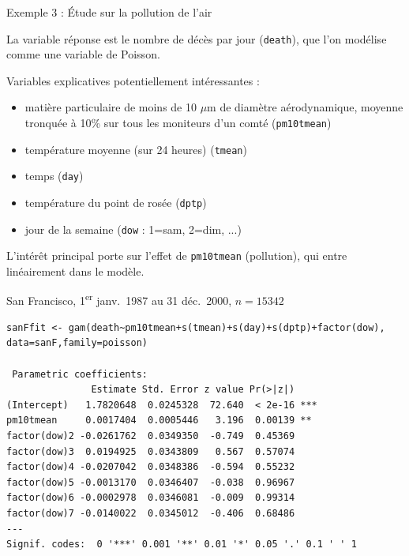 \documentclass{BeamerTemplate}
\begin{document}
\begin{refsection}
\begin{frame}{Exemple 3 : Étude sur la pollution de l'air}
\bigskip

La variable réponse est le nombre de décès par jour (\texttt{death}), que l'on
modélise comme une variable de Poisson.
\end{frame}

\begin{frame}{}

Variables explicatives potentiellement intéressantes :
\begin{itemize}
\item matière particulaire de moins de 10 $\mu$m de diamètre aérodynamique,
moyenne tronquée à 10\% sur tous les moniteurs d'un comté (\texttt{pm10tmean})
\item température moyenne (sur 24 heures) (\texttt{tmean})
\item temps (\texttt{day})
\item température du point de rosée (\texttt{dptp})
\item jour de la semaine (\texttt{dow} : 1=sam, 2=dim, ...)
\end{itemize}

\bigskip

L'intérêt principal porte sur l'effet de \texttt{pm10tmean} (pollution), qui entre
linéairement dans le modèle.
\end{frame}


\begin{frame}[fragile]{San Francisco, 1\textsuperscript{er} janv.\ 1987 au 31 déc.\ 2000,
$n=15342$}

{\scriptsize
\begin{verbatim}
sanFfit <- gam(death~pm10tmean+s(tmean)+s(day)+s(dptp)+factor(dow),
data=sanF,family=poisson)

 Parametric coefficients:
               Estimate Std. Error z value Pr(>|z|)    
(Intercept)   1.7820648  0.0245328  72.640  < 2e-16 ***
pm10tmean     0.0017404  0.0005446   3.196  0.00139 ** 
factor(dow)2 -0.0261762  0.0349350  -0.749  0.45369    
factor(dow)3  0.0194925  0.0343809   0.567  0.57074    
factor(dow)4 -0.0207042  0.0348386  -0.594  0.55232    
factor(dow)5 -0.0013170  0.0346407  -0.038  0.96967    
factor(dow)6 -0.0002978  0.0346081  -0.009  0.99314    
factor(dow)7 -0.0140022  0.0345012  -0.406  0.68486    
---
Signif. codes:  0 '***' 0.001 '**' 0.01 '*' 0.05 '.' 0.1 ' ' 1
\end{verbatim}
}
\end{frame}

\begin{frame}[fragile]{}


\end{frame}
\end{refsection}
\end{document}
